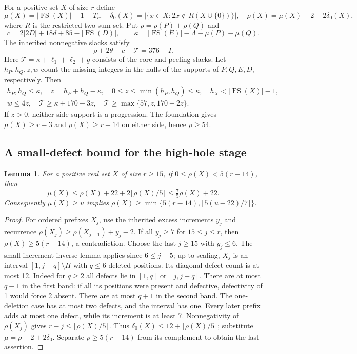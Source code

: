 \documentclass[11pt,a4paper]{article}
\newcommand{\FS}{\operatorname{FS}}
\newcommand{\T}{\mathcal T}
\newtheorem{lemma}[theorem]{Lemma}
\begin{document}
For a positive set $X$ of size $r$ define
\[
 \mu(X)=|\FS(X)|-1-T_r,\quad
 \delta_0(X)=|\{x\in X:2x\notin R(X\cup\{0\})\}|,
 \quad\rho(X)=\mu(X)+2-2\delta_0(X),
\]
where $R$ is the restricted two-sum set. Put $\rho=\rho(P)+\rho(Q)$ and
\[
 c=2|2D|+18d+85-|\FS(D)|,\qquad
 \kappa=|\FS(E)|-\Lambda-\mu(P)-\mu(Q).
\]
The inherited nonnegative slacks satisfy
\begin{equation}\label{eq:budget}
 \rho+2\theta+c+\T=376-I.
\end{equation}
Here $\T=\kappa+\ell_1+\ell_2+g$ consists of the core and peeling slacks.
Let $h_P,h_Q,z,w$ count the missing integers in the hulls of the
supports of $P,Q,E,D$, respectively. Then
\begin{gather}
 h_P,h_Q\le\kappa,\quad z=h_P+h_Q-\kappa,
 \quad0\le z\le\min(h_P,h_Q)\le\kappa,
 \quad h_X<|\FS(X)|-1,\label{eq:holes}\\
 w\le4z,\quad \T\ge\kappa+170-3z,
 \quad\T\ge\max\{57,z,170-2z\}.\label{eq:T}
\end{gather}
If $z>0$, neither side support is a progression. The foundation gives
$\mu(X)\ge r-3$ and $\rho(X)\ge r-14$ on either side, hence $\rho\ge54$.

\subsection{A small-defect bound for the high-hole stage}
\begin{lemma}\label{lem:small}
For a positive real set $X$ of size $r\ge15$, if
$0\le\rho(X)<5(r-14)$, then
\[
 \mu(X)\le\rho(X)+22+2\lfloor\rho(X)/5\rfloor
 \le\tfrac75\rho(X)+22.
\]
Consequently $\mu(X)\ge u$ implies
$\rho(X)\ge\min\{5(r-14),\lceil5(u-22)/7\rceil\}$.
\end{lemma}
\begin{proof}
For ordered prefixes $X_j$, use the inherited excess increments $y_j$
and recurrence $\rho(X_j)\ge\rho(X_{j-1})+y_j-2$.
If all $y_j\ge7$ for $15\le j\le r$, then
$\rho(X)\ge5(r-14)$, a contradiction.
Choose the last $j\ge15$ with $y_j\le6$. The small-increment inverse
lemma applies since $6\le j-5$; up to scaling, $X_j$ is an interval
$[1,j+q]\setminus H$ with $q\le6$ deleted positions.
Its diagonal-defect count is at most 12.
Indeed for $q\ge2$ all defects lie in $[1,q]$ or $[j,j+q]$.
There are at most $q-1$ in the first band: if all its positions were
present and defective, defectivity of 1 would force 2 absent.
There are at most $q+1$ in the second band. The one-deletion case has
at most two defects, and the interval has one.
Every later prefix adds at most one defect, while its increment is at
least 7. Nonnegativity of $\rho(X_j)$ gives
$r-j\le\lfloor\rho(X)/5\rfloor$. Thus
$\delta_0(X)\le12+\lfloor\rho(X)/5\rfloor$; substitute
$\mu=\rho-2+2\delta_0$. Separate $\rho\ge5(r-14)$ from its complement
to obtain the last assertion.
\end{proof}
\end{document}
